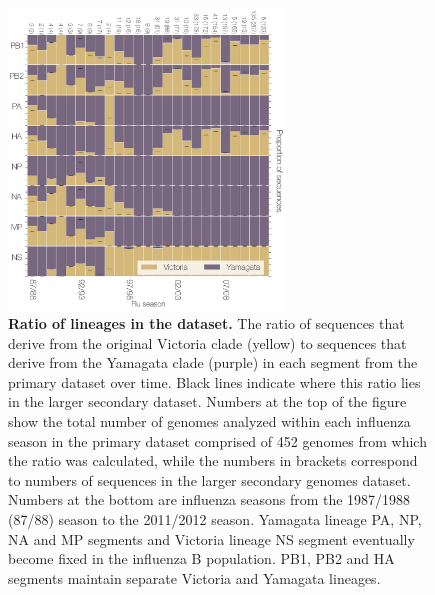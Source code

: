 \documentclass[11pt,oneside,letterpaper]{article}
\begin{document}
\begin{figure}[h]
	\centering	
	\includegraphics[width=0.65\textwidth]	{figures/InfB_LineageRatiosOverTime.png}
	\caption{\textbf{Ratio of lineages in the dataset.}
The ratio of sequences that derive from the original Victoria clade (yellow) to sequences that derive from the Yamagata clade (purple) in each segment from the primary dataset over time.
Black lines indicate where this ratio lies in the larger secondary dataset.
Numbers at the top of the figure show the total number of genomes analyzed within each influenza season in the primary dataset comprised of 452 genomes from which the ratio was calculated, while the numbers in brackets correspond to numbers of sequences in the larger secondary genomes dataset.
Numbers at the bottom are influenza seasons from the 1987/1988 (87/88) season to the 2011/2012 season.
Yamagata lineage PA, NP, NA and MP segments and Victoria lineage NS segment eventually become fixed in the influenza B population.
PB1, PB2 and HA segments maintain separate Victoria and Yamagata lineages.}
	\label{lineageRatiosOverTime}
\end{figure}
\end{document}
